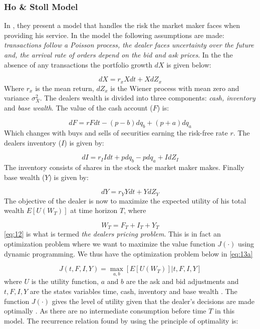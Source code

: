 \documentclass{kththesis}
\theoremstyle{definition}
\begin{document}
\subsubsection*{Ho \& Stoll Model}
In \textcite{ho1981optimal}, they present a model that handles the risk the market maker faces when providing his service. In the model the following assumptions are made: \textit{transactions follow a Poisson process, the dealer faces uncertainty over the future and, the arrival rate of orders depend on the bid and ask prices}. In the the absence of any transactions the portfolio growth $dX$ is given below:

\begin{equation}
    \label{eq:8}
    dX = r_{x}Xdt + XdZ_x
\end{equation}
Where $r_x$ is the mean return, $dZ_x$ is the Wiener process with mean zero and variance $\sigma^{2}_X$. The dealers wealth is divided into three components: \textit{cash, inventory} and \textit{base wealth}. The value of the cash account ($F$) is:

\begin{equation}
    \label{eq:9}
    dF = rFdt- (p-b)dq_b + (p+a)dq_a
\end{equation}
Which changes with buys and sells of securities earning the risk-free rate $r$. The dealers inventory ($I$) is given by:

\begin{equation}
    \label{eq:10}
    dI = r_{I}Idt+pdq_{b} - pdq_{a} + IdZ_{I}
\end{equation}
The inventory consists of shares in the stock the market maker makes.
Finally base wealth ($Y$) is given by:

\begin{equation}
    \label{eq:11}
    dY = r_{Y}Ydt+YdZ_{Y} 
\end{equation}
The objective of the dealer is now to maximize the expected utility of his total wealth $E[U(W_T)]$ at time horizon $T$, where 

\begin{equation}
    \label{eq:12}
    W_{T} = F_{T} + I_{T} + Y_{T}
\end{equation}
\autoref{eq:12} is what is termed \textit{the dealers pricing problem}. This is in fact an optimization problem where we want to maximize the value function $J(\cdot)$ using dynamic programming. We thus have the optimization problem below in \autoref{eq:13a}

\begin{equation}
    \label{eq:13a}
    J(t,F,I,Y) = \underset{a,b}{\max}[E[U(W_T)] | t,F,I,Y]
\end{equation}
where $U$ is the utility function, $a$ and $b$ are the ask and bid adjustments and $t, F, I,Y$ are the states variables time, cash, inventory and base wealth \parencite{o1995market}. The function $J(\cdot)$ gives the level of utility given that the dealer's decisions are made optimally \parencite{o1995market}. As there are no intermediate consumption before time $T$ in this model. The recurrence relation found by using the principle of optimality is:
\end{document}

